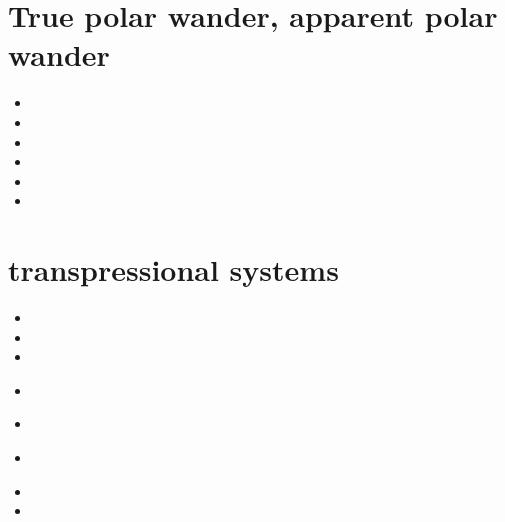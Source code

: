 \section{True polar wander, apparent polar wander} 

\begin{small}
\begin{itemize}
\item[2002] 
\item[2003] 
\item[2007] 
\item[2009] 
\item[2017]
\item[2025] 
\end{itemize}
\end{small}

\section{transpressional systems} 

\begin{small}
\begin{itemize}
\item[\nineteenninetythree] 
\item[\nineteenninetyfour] 
\item[\nineteenninetyseven] 
\item[\twothousandthree] 
\\
\item[\twothousandeleven] 
\item[\twothousandseventeen] 
\\
\item[\twothousandeighteen] 
\item[2026]
\end{itemize}
\end{small}






